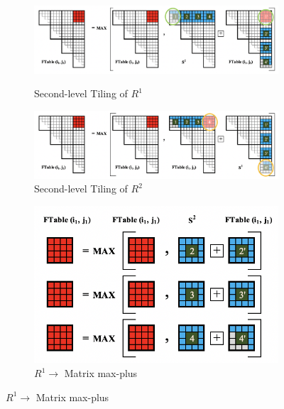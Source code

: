 \begin{figure}
\centering
\begin{subfigure}[b]{0.48\textwidth}
\centering
\includegraphics[scale=0.36, trim=4 4 4 4,clip]{content/figures/r1_top.png}
\label{fig:mono_r1_top}
\caption{Second-level Tiling of $R^{1}$}
\vspace{1mm}
\end{subfigure}
\centering
\begin{subfigure}[b]{0.48\textwidth}
\centering
\includegraphics[scale=0.36, trim=4 4 4 4,clip]{content/figures/r2_top.png}
\caption{Second-level Tiling of $R^{2}$}
\label{fig:mono_r2_top}
\vspace{1mm}
\end{subfigure}
\begin{subfigure}[b]{0.22\textwidth}
\centering
\includegraphics[width=\textwidth, scale=0.30, trim=4 4 4 4,clip]{content/figures/r1_max_plus.png}
\caption{$R^{1} \to$ Matrix max-plus}

\end{subfigure}
\end{figure}
